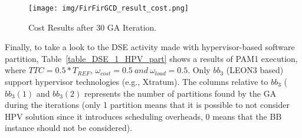 %
%
\begin{figure}[htbp]
	\centerline{\texttt{[image: img/FirFirGCD\_result\_cost.png]}}
	\caption{Cost Results after 30 GA Iteration.}
	\label{fig8}
\end{figure}
%
Finally, to take a look to the DSE activity made with hypervisor-based software partition, Table~\ref{table_DSE_1_HPV_part} shows a results of PAM1 execution, where $TTC = 0.5 * T_{REF}$, $\omega_{cost} = 0.5 \ and \ \omega_{load} = 0.5$. Only $bb_3$ (LEON3 based) support hypervisor technologies (e.g., Xtratum). The columns relative to $bb_3$ ($bb_3 (1)$ and $bb_3 (2)$ represents the number of partitions found by the GA during the iterations (only 1 partition means that it is possible to not consider HPV solution since it introduces scheduling overheads, 0 means that the BB instance should not be considered). \par
%
